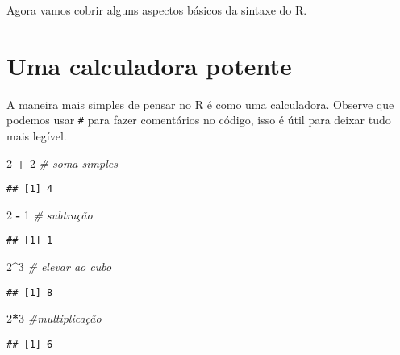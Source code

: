 \documentclass[]{article}
\newenvironment{Shaded}{\begin{snugshade}}{\end{snugshade}}
\newcommand{\CommentTok}[1]{\textcolor[rgb]{0.56,0.35,0.01}{\textit{#1}}}
\newcommand{\DecValTok}[1]{\textcolor[rgb]{0.00,0.00,0.81}{#1}}
\newcommand{\OperatorTok}[1]{\textcolor[rgb]{0.81,0.36,0.00}{\textbf{#1}}}
\newcommand{\StringTok}[1]{\textcolor[rgb]{0.31,0.60,0.02}{#1}}
\begin{document}
Agora vamos cobrir alguns aspectos básicos da sintaxe do R.

\hypertarget{uma-calculadora-potente}{%
\section{Uma calculadora potente}\label{uma-calculadora-potente}}

A maneira mais simples de pensar no R é como uma calculadora. Observe
que podemos usar \texttt{\#} para fazer comentários no código, isso é
útil para deixar tudo mais legível.

\begin{Shaded}
\begin{Highlighting}[]
\DecValTok{2} \OperatorTok{+}\StringTok{ }\DecValTok{2} \CommentTok{# soma simples}
\end{Highlighting}
\end{Shaded}

\begin{verbatim}
## [1] 4
\end{verbatim}

\begin{Shaded}
\begin{Highlighting}[]
\DecValTok{2} \OperatorTok{-}\StringTok{ }\DecValTok{1} \CommentTok{# subtração}
\end{Highlighting}
\end{Shaded}

\begin{verbatim}
## [1] 1
\end{verbatim}

\begin{Shaded}
\begin{Highlighting}[]
\DecValTok{2}\OperatorTok{^}\DecValTok{3} \CommentTok{# elevar ao cubo}
\end{Highlighting}
\end{Shaded}

\begin{verbatim}
## [1] 8
\end{verbatim}

\begin{Shaded}
\begin{Highlighting}[]
\DecValTok{2}\OperatorTok{*}\DecValTok{3} \CommentTok{#multiplicação}
\end{Highlighting}
\end{Shaded}

\begin{verbatim}
## [1] 6
\end{verbatim}
\end{document}
